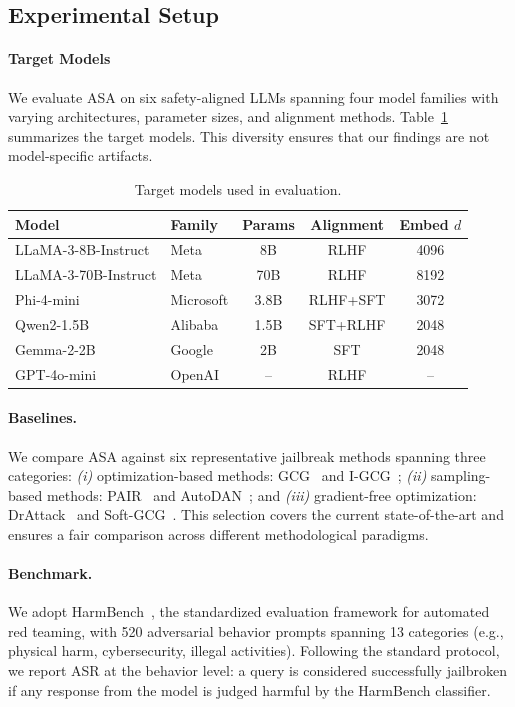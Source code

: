 \documentclass[preprint,12pt]{elsarticle}
\begin{document}
\subsection{Experimental Setup}
\label{sec:exp_setup}

\paragraph{Target Models} We evaluate ASA on six safety-aligned LLMs spanning four model families with varying architectures, parameter sizes, and alignment methods. Table~\ref{tab:models} summarizes the target models. This diversity ensures that our findings are not model-specific artifacts.

\begin{table}[t]
\centering
\caption{Target models used in evaluation.}
\label{tab:models}
\begin{tabular}{llccc}
\toprule
\textbf{Model} & \textbf{Family} & \textbf{Params} & \textbf{Alignment} & \textbf{Embed $d$} \\
\midrule
LLaMA-3-8B-Instruct & Meta & 8B & RLHF & 4096 \\
LLaMA-3-70B-Instruct & Meta & 70B & RLHF & 8192 \\
Phi-4-mini & Microsoft & 3.8B & RLHF+SFT & 3072 \\
Qwen2-1.5B & Alibaba & 1.5B & SFT+RLHF & 2048 \\
Gemma-2-2B & Google & 2B & SFT & 2048 \\
GPT-4o-mini & OpenAI & -- & RLHF & -- \\
\bottomrule
\end{tabular}
\end{table}

\paragraph{Baselines.} We compare ASA against six representative jailbreak methods spanning three categories: \textit{(i)} optimization-based methods: GCG~\cite{zou2023universal} and I-GCG~\cite{jia2024improved}; \textit{(ii)} sampling-based methods: PAIR~\cite{chao2023jailbreaking} and AutoDAN~\cite{zhu2023autodan}; and \textit{(iii)} gradient-free optimization: DrAttack~\cite{ren2024drattack} and Soft-GCG~\cite{ren2024soft}. This selection covers the current state-of-the-art and ensures a fair comparison across different methodological paradigms.

\paragraph{Benchmark.} We adopt HarmBench~\cite{mazeika2024harmbench}, the standardized evaluation framework for automated red teaming, with 520 adversarial behavior prompts spanning 13 categories (e.g., physical harm, cybersecurity, illegal activities). Following the standard protocol, we report ASR at the behavior level: a query is considered successfully jailbroken if any response from the model is judged harmful by the HarmBench classifier.
\end{document}
